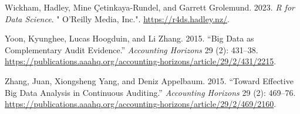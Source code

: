 \documentclass[
  letterpaper,
  DIV=11,
  numbers=noendperiod]{scrreprt}
\newlength{\cslhangindent}
\newenvironment{CSLReferences}[2] %
 {\begin{list}{}{%
  \setlength{\itemindent}{0pt}
  \setlength{\leftmargin}{0pt}
  \setlength{\parsep}{0pt}
  \ifodd #1
   \setlength{\leftmargin}{\cslhangindent}
   \setlength{\itemindent}{-1\cslhangindent}
  \fi
  \setlength{\itemsep}{#2\baselineskip}}}
 {\end{list}}
\begin{document}
\begin{CSLReferences}{1}{1}
Wickham, Hadley, Mine Çetinkaya-Rundel, and Garrett Grolemund. 2023.
\emph{R for Data Science}. " O'Reilly Media, Inc.".
\url{https://r4ds.hadley.nz/}.

Yoon, Kyunghee, Lucas Hoogduin, and Li Zhang. 2015. {``Big Data as
Complementary Audit Evidence.''} \emph{Accounting Horizons} 29 (2):
431--38.
\url{https://publications.aaahq.org/accounting-horizons/article/29/2/431/2215}.

Zhang, Juan, Xiongsheng Yang, and Deniz Appelbaum. 2015. {``Toward
Effective Big Data Analysis in Continuous Auditing.''} \emph{Accounting
Horizons} 29 (2): 469--76.
\url{https://publications.aaahq.org/accounting-horizons/article/29/2/469/2160}.

\end{CSLReferences}
\end{document}
